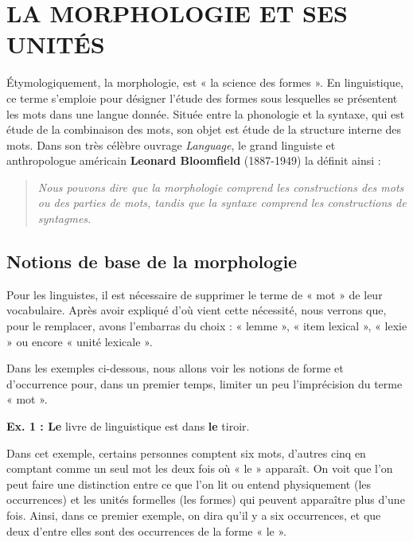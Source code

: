\section{LA MORPHOLOGIE ET SES UNITÉS}
Étymologiquement, la morphologie, est « la science des formes ». En linguistique, ce terme s’emploie pour désigner l’étude des formes sous lesquelles se présentent les mots dans une langue donnée. Située entre la phonologie et la syntaxe, qui est étude de la combinaison des mots, son objet est étude de la structure interne des mots. Dans son très célèbre ouvrage \textit{Language}, le grand linguiste et anthropologue américain \textbf{Leonard Bloomfield} (1887-1949) la définit ainsi :
\begin{quote}\small\itshape
Nous pouvons dire que la morphologie comprend les constructions des mots ou des parties de mots, tandis que la syntaxe comprend les constructions de syntagmes.
\end{quote}

\subsection{Notions de base de la morphologie}
Pour les linguistes, il est nécessaire de supprimer le terme de « mot » de leur vocabulaire. Après avoir expliqué d’où vient cette nécessité, nous verrons que, pour le remplacer, avons l’embarras du choix : « lemme », « item lexical », « lexie » ou encore « unité lexicale ».

Dans les exemples ci-dessous, nous allons voir les notions de forme et d’occurrence pour, dans un premier temps, limiter un peu l’imprécision du terme « mot ».

\noindent\textbf{Ex. 1 : Le} livre de linguistique est dans \textbf{le} tiroir.

Dans cet exemple, certains personnes comptent six mots, d’autres cinq en comptant comme un seul mot les deux fois où « le » apparaît. On voit que l’on peut faire une distinction entre ce que l’on lit ou entend physiquement (les occurrences) et les unités formelles (les formes) qui peuvent apparaître plus d’une fois. Ainsi, dans ce premier exemple, on dira qu’il y a six occurrences, et que deux d’entre elles sont des occurrences de la forme « le ».

